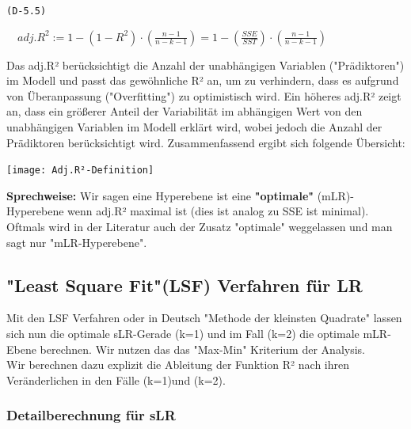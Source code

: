 \documentclass[12pt]{article}
\begin{document}
\begin{center}
\texttt{(D-5.5)}
\begin{large}
\textbf{$ \quad adj.R^2 := 1 - (1 - R^2) \cdot (\frac{n-1}{n-k-1}) = 1 - (\frac{SSE}{SST}) \cdot (\frac{n-1}{n-k-1}) $}  \\[0.6cm] 
\end{large}     
\end{center}
%
Das adj.R² berücksichtigt die Anzahl der unabhängigen Variablen ("Prädiktoren") im Modell und passt das gewöhnliche R² an, um zu verhindern, dass es aufgrund von Überanpassung ("Overfitting") zu optimistisch wird. Ein höheres adj.R² zeigt an, dass ein größerer Anteil der Variabilität im abhängigen Wert von den unabhängigen Variablen im Modell erklärt wird, wobei jedoch die Anzahl der Prädiktoren berücksichtigt wird. Zusammenfassend ergibt sich folgende Übersicht:\\

\begin{center}
\texttt{[image: Adj.R²-Definition]}\\
\end{center}
%
\textbf{Sprechweise:} Wir sagen eine Hyperebene ist eine \textbf{"optimale"} (mLR)- Hyperebene wenn adj.R² maximal ist (dies ist analog zu SSE ist minimal). Oftmals wird in der Literatur auch der Zusatz "optimale" weggelassen und man sagt nur "mLR-Hyperebene".\\ 

\subsection{"Least Square Fit"(LSF) Verfahren für LR}

Mit den LSF Verfahren oder in Deutsch "Methode der kleinsten Quadrate" lassen sich nun die optimale sLR-Gerade (k=1) und im Fall (k=2) die optimale mLR-Ebene berechnen. Wir nutzen das das "Max-Min" Kriterium der Analysis.\\
Wir berechnen dazu explizit die Ableitung der Funktion R² nach ihren Veränderlichen in den Fälle (k=1)und (k=2). 

\subsubsection{Detailberechnung für sLR}
\end{document}
